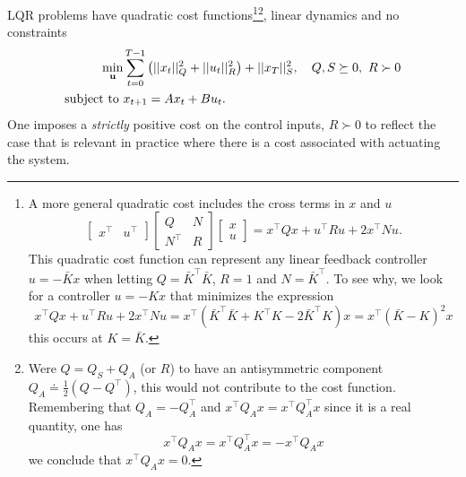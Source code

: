 LQR problems have quadratic cost functions\footnote{A more general quadratic cost includes the cross terms in $x$ and $u$
\begin{equation*}
  \begin{bmatrix}
    x^\top & u^\top
  \end{bmatrix}
  \begin{bmatrix}
    Q & N \\ N^\top & R
  \end{bmatrix}
  \begin{bmatrix}
    x \\ u
  \end{bmatrix} = x^\top Qx + u^\top Ru + 2x^\top N u.
\end{equation*}
This quadratic cost function can represent any linear feedback controller $u = -\bar{K}x$ when letting $Q = \bar{K}^\top \bar{K}$, $R = 1$ and $N = \bar{K}^\top$. To see why, we look for a controller $u=-Kx$ that minimizes the expression
\begin{equation*}
  x^\top Qx + u^\top Ru + 2x^\top N u = x^\top \left(\bar{K}^\top \bar{K} + K^\top K - 2 \bar{K}^\top K\right) x = x^\top \left(\bar{K}-K\right)^2x
\end{equation*}
this occurs at $K=\bar{K}$.}\footnote{Were $Q = Q_S+Q_A$ (or $R$) to have an antisymmetric component $Q_A\doteq\tfrac{1}{2}\left(Q-Q^\top\right)$, this would not contribute to the cost function. Remembering that $Q_A=-Q_A^\top$ and $x^\top Q_Ax = x^\top Q_A^\top x$ since it is a real quantity, one has
\begin{equation*}
  x^\top Q_Ax = x^\top Q_A^\top x = -x^\top Q_Ax
\end{equation*}
we conclude that $x^\top Q_Ax=0$.}, linear dynamics and no constraints
\begin{equation}
  \label{eq:LQR-formulation}
  \begin{aligned}
    \min_{\boldsymbol{\mathrm{u}}} & \sum_{t=0}^{T-1} \left(||x_t||_Q^2 + ||u_t||_R^2\right) + ||x_T||_S^2,\quad Q,S \succeq 0,\ R \succ 0 \\
    \text{subject to } & x_{t+1} = Ax_t + Bu_t.
  \end{aligned}
\end{equation}
One imposes a \emph{strictly} positive cost on the control inputs, $R\succ 0$ to reflect the case that is relevant in practice where there is a cost associated with actuating the system.

